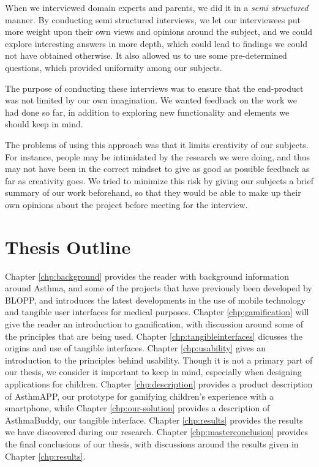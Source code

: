 When we interviewed domain experts and parents, we did it in a \emph{semi structured} manner. By conducting semi structured interviews, we let our interviewees put more weight upon their own views and opinions around the subject, and we could explore interesting answers in more depth, which could lead to findings we could not have obtained otherwise. It also allowed us to use some pre-determined questions, which provided uniformity among our subjects.

The purpose of conducting these interviews was to ensure that the end-product was not limited by our own imagination. We wanted feedback on the work we had done so far, in addition to exploring new functionality and elements we should keep in mind. 

The problems of using this approach was that it limits creativity of our subjects. For instance, people may be intimidated by the research we were doing, and thus may not have been in the correct mindset to give as good as possible feedback as far as creativity goes. We tried to minimize this risk by giving our subjects a brief summary of our work beforehand, so that they would be able to make up their own opinions about the project before meeting for the interview.


\section{Thesis Outline}
Chapter \ref{chp:background} provides the reader with background information around Asthma, and some of the projects that have previously been developed by BLOPP, and introduces the latest developments in the use of mobile technology and tangible user interfaces for medical purposes. 
Chapter \ref{chp:gamification} will give the reader an introduction to gamification, with discussion around some of the principles that are being used. 
Chapter \ref{chp:tangibleinterfaces} dicusses the origins and use of tangible interfaces.
Chapter \ref{chp:usability} gives an introduction to the principles behind usability. Though it is not a primary part of our thesis, we consider it important to keep in mind, especially when designing applications for children.
Chapter \ref{chp:description} provides a product description of AsthmAPP, our prototype for gamifying children's experience with a smartphone, while Chapter \ref{chp:our-solution} provides a description of AsthmaBuddy, our tangible interface.
Chapter \ref{chp:results} provides the results we have discovered during our research.
Chapter \ref{chp:masterconclusion} provides the final conclusions of our thesis, with discussions around the results given in Chapter \ref{chp:results}.          
